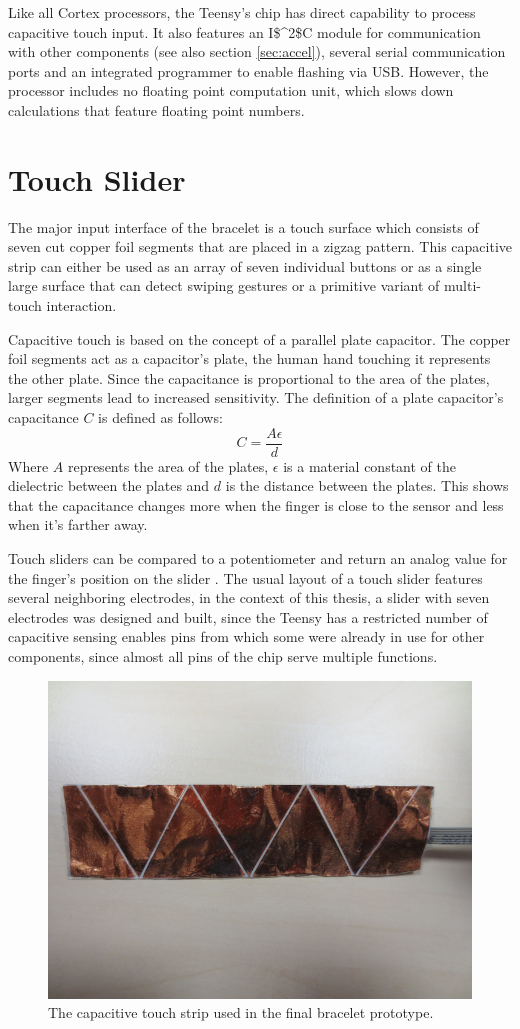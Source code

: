 Like all Cortex processors, the Teensy's chip has direct capability to process capacitive touch input. It also features an \ac{I$^2$C} module for communication with other components (see also section \ref{sec:accel}), several serial communication ports and an integrated programmer to enable flashing via \ac{USB}. However, the processor includes no floating point computation unit, which slows down calculations that feature floating point numbers. %

\section{Touch Slider}
The major input interface of the bracelet is a touch surface which consists of seven cut copper foil segments that are placed in a zigzag pattern. This capacitive strip can either be used as an array of seven individual buttons or as a single large surface that can detect swiping gestures or a primitive variant of multi-touch interaction.

Capacitive touch is based on the concept of a parallel plate capacitor. The copper foil segments act as a capacitor's plate, the human hand touching it represents the other plate. Since the capacitance is proportional to the area of the plates, larger segments lead to increased sensitivity. The definition of a plate capacitor's capacitance $C$ is defined as follows:
\[
	C = \frac{A\epsilon}{d}
\]
Where $A$ represents the area of the plates, $\epsilon$ is a material constant of the dielectric between the plates and $d$ is the distance between the plates. This shows that the capacitance changes more when the finger is close to the sensor and less when it's farther away.

Touch sliders can be compared to a potentiometer and return an analog value for the finger's position on the slider \cite{Camacho2010}. The usual layout of a touch slider features several neighboring electrodes, in the context of this thesis, a slider with seven electrodes was designed and built, since the Teensy has a restricted number of capacitive sensing enables pins from which some were already in use for other components, since almost all pins of the chip serve multiple functions.
\begin{figure}[bth]
	\begin{center}
	\includegraphics[width=.5\linewidth]{gfx/touchstrip.png}
	\end{center}
	\caption{The capacitive touch strip used in the final bracelet prototype.}\label{fig:touch}
\end{figure}

